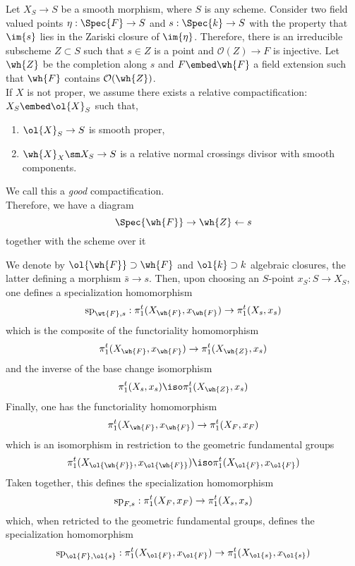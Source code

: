 \documentclass[12pt]{article}
\newcommand{\cO}{\mathcal{O}}
\theoremstyle{plain}
\begin{document}
Let $X_S \to S$ be a smooth morphism, where $S$ is any scheme. Consider two field valued points $\eta : \Spec{F} \to S$ and $s : \Spec{k} \to S$ with the property that $\im{s}$ lies in the Zariski closure of $\im{\eta}$. Therefore, there is an irreducible subscheme $Z \subset S$ such that $s \in Z$ is a point and $\cO(Z) \to F$ is injective. Let $\wh{Z}$ be the completion along $s$ and $F \embed \wh{F}$ a field extension such that $\wh{F}$ contains $\cO(\wh{Z})$.
\bigskip\\
If $X$ is not proper, we assume there exists a relative compactification: $X_S \embed \ol{X}_S$ such that,
\begin{enumerate}
\item $\ol{X}_S \to S$ is smooth proper,
\item $\wh{X}_X \sm X_S \to S$ is a relative normal crossings divisor with smooth components. 
\end{enumerate}
We call this a \textit{good} compactification. 
\bigskip\\
Therefore, we have a diagram
\[ \Spec{\wh{F}} \to \wh{Z} \leftarrow s \]
together with the scheme over it
\begin{center}
\end{center}
We denote by $\ol{\wh{F}} \supset \wh{F}$ and $\ol{k} \supset k$ algebraic closures, the latter defining a morphism $\bar{s} \to s$. Then, upon choosing an $S$-point $x_S : S \to X_S$, one defines a specialization homomorphism
\[ \sp_{\wt{F}, s} : \pi^t_1(X_{\wh{F}}, x_{\wh{F}}) \to \pi^t_1(X_s, x_s) \]
which is the composite of the functoriality homomorphism
\[ \pi_1^t(X_{\wh{F}}, x_{\wh{F}}) \to \pi^t_1(X_{\wh{Z}}, x_s) \]
and the inverse of the base change isomorphism
\[ \pi_1^t(X_s, x_s) \iso \pi_1^t(X_{\wh{Z}}, x_s) \]
Finally, one has the functoriality homomorphism
\[ \pi_1^t(X_{\wh{F}}, x_{\wh{F}}) \to \pi_1^t(X_F, x_F) \]
which is an isomorphism in restriction to the geometric fundamental groups
\[ \pi^t_1(X_{\ol{\wh{F}}}, x_{\ol{\wh{F}}}) \iso \pi_1^t(X_{\ol{F}}, x_{\ol{F}}) \]
Taken together, this defines the specialization homomorphism
\[ \sp_{F,s} : \pi_1^t(X_F, x_F) \to \pi^t_1(X_s, x_s) \]
which, when retricted to the geometric fundamental groups, defines the specialization homomorphism
\[ \sp_{\ol{F}, \ol{s}} : \pi^t_1(X_{\ol{F}}, x_{\ol{F}}) \to \pi_1^t(X_{\ol{s}}, x_{\ol{s}}) \]
\end{document}
